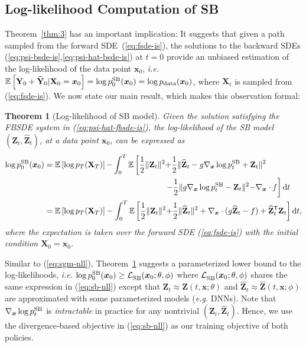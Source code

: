 \documentclass{article}
\def\eqref#1{(\ref{#1})}
\def\rvX{{\mathbf{X}}}
\def\rvY{{\mathbf{Y}}}
\def\rvZ{{\mathbf{Z}}}
\def\vx{{\bm{x}}}
\newcommand{\pdata}{p_{\rm{data}}}
\newcommand{\E}{\mathbb{E}}
\newcommand{\norm}[1]{\lVert#1\rVert}
\def\dt{{ \mathrm{d} t }}
\def\calL{{\cal L}}
\newcommand{\br}[1]{\left[#1\right]}
\newcommand{\T}{\mathsf{T}}
\newcommand{\eg}{{\ignorespaces\emph{e.g.}}{ }}
\newcommand{\ie}{{\ignorespaces\emph{i.e.}}{ }}
\newtheorem{theorem}{Theorem}
\begin{document}
\vspace{-2pt}
\subsection{Log-likelihood Computation of SB} \label{sec:3.2}
\vspace{-2pt}


\def\LSGM{{\calL^{\text{}}_{\text{\normalfont{SGM}}}}}
\def\LSB{{\calL^{\text{}}_{\text{\normalfont{SB}}}}}
\def\LSBB{{\widetilde{\calL}^{\text{}}_{\text{\normalfont{SB}}}}}

Theorem~\ref{thm:3} has an important implication:
It suggests that
given a path sampled from the forward SDE~\eqref{eq:fsde-is},
the solutions to the backward SDEs (\ref{eq:psi-bsde-is},\ref{eq:psi-hat-bsde-is}) at $t=0$
provide an unbiased estimation of the log-likelihood of the data point $\vx_0$,
\ie $\E\br{\rvY_0 + \widehat{\rvY}_0 | \rvX_0=\vx_0} = \log \pp{0}{SB}(\vx_0) = \log \pdata(\vx_0)$,
where $\rvX_t$ is sampled from \eqref{eq:fsde-is}.
We now state our main result, which makes this observation formal:\begin{theorem}[Log-likelihood of SB model] \label{thm:4}
    Given the solution satisfying the FBSDE system in \eqref{eq:psi-hat-fbsde-is},
    the log-likelihood of the SB model $(\rvZ_t, \widehat{\rvZ}_t)$, at a data point $\vx_0$, can be expressed as
  \begin{align}
      \log \pp{0}{SB}(\vx_0) &= \E\br{\log p_T(\rvX_T)} {-} \int_0^T \E\left[ \frac{1}{2} \norm{\rvZ_t}^2 {+} \frac{1}{2} \norm{\widehat{\rvZ}_t - g\nabla_\vx \log \pp{t}{SB} + \rvZ_t}^2 \right. \nonumber \\
      & \qquad \qquad \qquad \qquad \qquad \quad \qquad \qquad \left.  {-} \frac{1}{2} \norm{g\nabla_\vx \log \pp{t}{SB} - \rvZ_t}^2 {-} \nabla_\vx \cdot f \right] \dt \label{eq:sb-nll-bad} \\
      &= \E\br{\log p_T(\rvX_T)} - \int_0^T \E\br{ \frac{1}{2} \norm{\rvZ_t}^2 {+} \frac{1}{2} \norm{\widehat{\rvZ}_t}^2  + \nabla_\vx \cdot (g\widehat{\rvZ}_t -f) + \widehat{\rvZ}_t^\T{\rvZ}_t } \dt, \label{eq:sb-nll}
  \end{align}
  where the expectation is taken over the forward SDE \eqref{eq:fsde-is} with the initial condition $\rvX_0 = \vx_0$.
\end{theorem}
  Similar to \eqref{eq:sgm-nll}, Theorem~\ref{thm:4} suggests a parameterized lower bound to the log-likelihoods, \ie $\log \pp{0}{SB}(\vx_0) \ge \LSB(\vx_0; \theta, \phi)$ where $\LSB(\vx_0; \theta, \phi)$ shares the same expression in \eqref{eq:sb-nll} except that
  $\rvZ_t \approx \rvZ(t,\vx; \theta)$ and $\widehat{\rvZ}_t \approx \widehat{\rvZ}(t,\vx; \phi)$ are approximated with some parameterized models (\eg DNNs).
  Note that $\nabla_\vx \log \pp{t}{SB}$ is \emph{intractable} in practice for any nontrivial $(\rvZ_t, \widehat{\rvZ}_t)$.
  Hence, we use the divergence-based objective in \eqref{eq:sb-nll} as our training objective of both policies.
\end{document}
